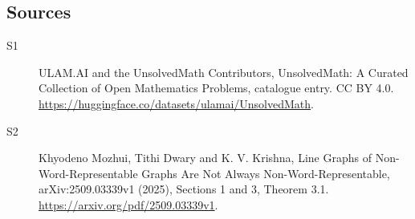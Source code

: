 \documentclass[11pt]{article}
\begin{document}
\subsection{Sources}
\begin{description}
\item[\hypertarget{source:statement:1}{S1}] ULAM.AI and the UnsolvedMath Contributors, UnsolvedMath: A Curated Collection of Open Mathematics Problems, catalogue entry. CC BY 4.0. \url{https://huggingface.co/datasets/ulamai/UnsolvedMath}.
\item[\hypertarget{source:statement:2}{S2}] Khyodeno Mozhui, Tithi Dwary and K. V. Krishna, Line Graphs of Non-Word-Representable Graphs Are Not Always Non-Word-Representable, arXiv:2509.03339v1 (2025), Sections 1 and 3, Theorem 3.1. \url{https://arxiv.org/pdf/2509.03339v1}.
\end{description}
\label{end:statement}
\end{document}

